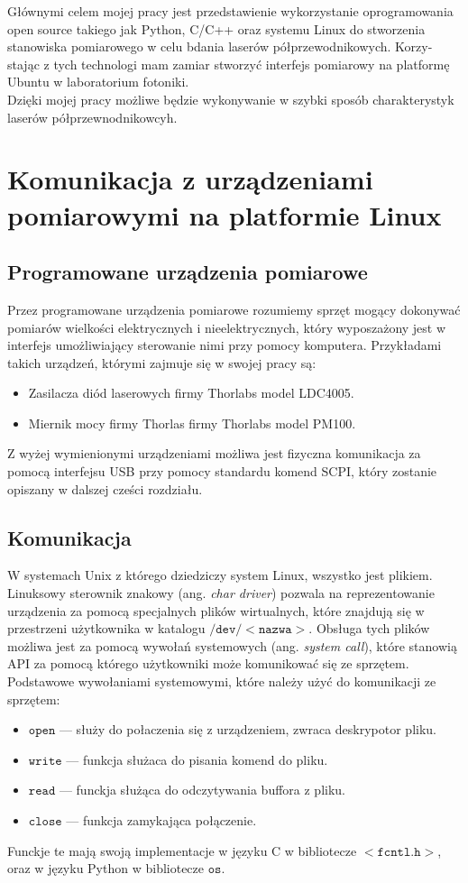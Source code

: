 \documentclass[a4paper, portrait,12pt]{report}
\begin{document}
Głównymi celem mojej pracy jest przedstawienie wykorzystanie oprogramowania
open source takiego jak Python, C/C++ oraz systemu Linux do stworzenia stanowiska pomiarowego w celu bdania laserów półprzewodnikowych. Korzy-
stając z tych technologi mam zamiar stworzyć interfejs pomiarowy na platformę Ubuntu
w laboratorium fotoniki. \\

Dzięki mojej pracy możliwe będzie wykonywanie w szybki sposób charakterystyk laserów półprzewnodnikowcyh.



\chapter{Komunikacja z urządzeniami pomiarowymi na platformie Linux}
\section{Programowane urządzenia pomiarowe}
Przez  programowane urządzenia pomiarowe rozumiemy sprzęt mogący dokonywać pomiarów wielkości elektrycznych i nieelektrycznych, który wyposzażony jest w interfejs umożliwiający sterowanie nimi przy pomocy komputera. Przykładami takich urządzeń, którymi zajmuje się w swojej pracy są:
\begin{itemize}
\item Zasilacza diód laserowych firmy Thorlabs model LDC4005.
\item Miernik mocy firmy Thorlas firmy Thorlabs model PM100.
\end{itemize}
Z wyżej wymienionymi urządzeniami możliwa jest fizyczna komunikacja za pomocą interfejsu USB przy pomocy standardu komend SCPI, który zostanie opiszany w dalszej cześci rozdziału.

\section{Komunikacja}
W systemach Unix z którego dziedziczy system Linux, wszystko jest plikiem. Linuksowy sterownik znakowy (ang. \textit{char driver}) pozwala na reprezentowanie urządzenia za pomocą specjalnych plików wirtualnych, które znajdują się w przestrzeni użytkownika w katalogu $\mathtt{/dev/<nazwa>}$. Obsługa tych plików możliwa jest za pomocą wywołań systemowych (ang. \textit{system call}), które stanowią API za pomocą którego użytkowniki może komunikować się ze sprzętem. Podstawowe wywołaniami systemowymi, które należy użyć do komunikacji ze sprzętem:
\begin{itemize}
\item $\mathtt{open}$ --- służy do połaczenia się z urządzeniem, zwraca deskrypotor pliku.
\item $\mathtt{write}$ --- funkcja służaca do pisania komend do pliku.
\item $\mathtt{read}$ --- funckja służąca do odczytywania buffora z pliku.
\item $\mathtt{close}$ --- funkcja zamykająca połączenie.
\end{itemize}
Funckje te mają swoją implementacje w języku C w bibliotecze $<\mathtt{fcntl.h}>$, oraz w języku Python w bibliotecze $\mathtt{os}$.
\end{document}
